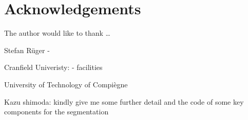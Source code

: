 \chapter{Acknowledgements}

The author would like to thank \dots

Stefan Rüger
- 

Cranfield Univeristy:
- facilities

University of Technology of Compiègne

Kazu shimoda:
kindly give me some further detail and the code of some key components for the segmentation
